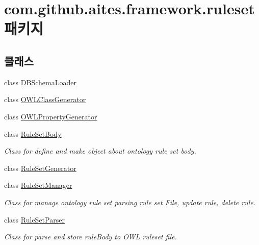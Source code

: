 \hypertarget{namespacecom_1_1github_1_1aites_1_1framework_1_1ruleset}{}\section{com.\+github.\+aites.\+framework.\+ruleset 패키지}
\label{namespacecom_1_1github_1_1aites_1_1framework_1_1ruleset}
\subsection*{클래스}
\begin{DoxyCompactItemize}
\item 
class \mbox{\hyperlink{classcom_1_1github_1_1aites_1_1framework_1_1ruleset_1_1_d_b_schema_loader}{D\+B\+Schema\+Loader}}
\item 
class \mbox{\hyperlink{classcom_1_1github_1_1aites_1_1framework_1_1ruleset_1_1_o_w_l_class_generator}{O\+W\+L\+Class\+Generator}}
\item 
class \mbox{\hyperlink{classcom_1_1github_1_1aites_1_1framework_1_1ruleset_1_1_o_w_l_property_generator}{O\+W\+L\+Property\+Generator}}
\item 
class \mbox{\hyperlink{classcom_1_1github_1_1aites_1_1framework_1_1ruleset_1_1_rule_set_body}{Rule\+Set\+Body}}
\begin{DoxyCompactList}\small\item\em Class for define and make object about ontology rule set body. \end{DoxyCompactList}\item 
class \mbox{\hyperlink{classcom_1_1github_1_1aites_1_1framework_1_1ruleset_1_1_rule_set_generator}{Rule\+Set\+Generator}}
\item 
class \mbox{\hyperlink{classcom_1_1github_1_1aites_1_1framework_1_1ruleset_1_1_rule_set_manager}{Rule\+Set\+Manager}}
\begin{DoxyCompactList}\small\item\em Class for manage ontology rule set parsing rule set File, update rule, delete rule. \end{DoxyCompactList}\item 
class \mbox{\hyperlink{classcom_1_1github_1_1aites_1_1framework_1_1ruleset_1_1_rule_set_parser}{Rule\+Set\+Parser}}
\begin{DoxyCompactList}\small\item\em Class for parse and store rule\+Body to O\+WL ruleset file. \end{DoxyCompactList}\end{DoxyCompactItemize}
